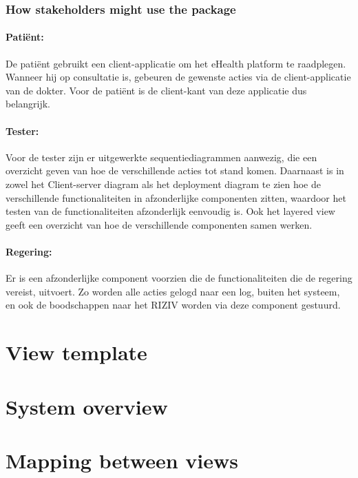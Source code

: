 \documentclass[a4paper,10pt]{article}
\begin{document}
\subsubsection{How stakeholders might use the package}

\paragraph{Patiënt:}
De patiënt gebruikt een client-applicatie om het eHealth platform te raadplegen. Wanneer hij op consultatie is, gebeuren de gewenste acties via de client-applicatie van de dokter. Voor de patiënt is de client-kant van deze applicatie dus belangrijk.

\paragraph{Tester:}
Voor de tester zijn er uitgewerkte sequentiediagrammen aanwezig, die een overzicht geven van hoe de verschillende acties tot stand komen. Daarnaast is in zowel het Client-server diagram als het deployment diagram te zien hoe de verschillende functionaliteiten in afzonderlijke componenten zitten, waardoor het testen van de functionaliteiten afzonderlijk eenvoudig is. Ook het layered view geeft een overzicht van hoe de verschillende componenten samen werken.

\paragraph{Regering:}
Er is een afzonderlijke component voorzien die de functionaliteiten die de regering vereist, uitvoert. Zo worden alle acties gelogd naar een log, buiten het systeem, en ook de boodschappen naar het RIZIV worden via deze component gestuurd. 

\clearpage
\section{View template}

\clearpage
\section{System overview}

\clearpage
\section{Mapping between views}
\label{Mappingbetweenviews}
\end{document}
